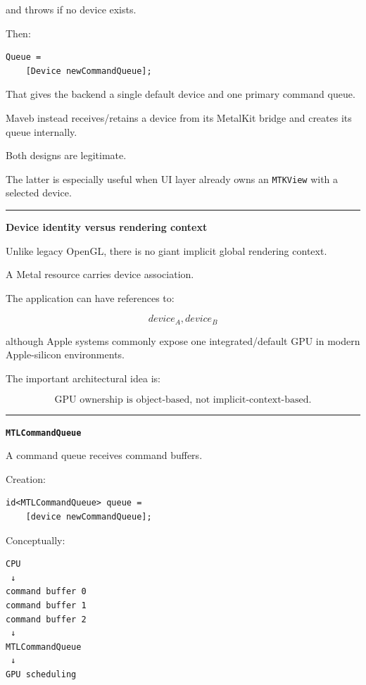 and throws if no device exists.

Then:

\begin{verbatim}
Queue =
    [Device newCommandQueue];
\end{verbatim}

That gives the backend a single default device and one primary command queue.

Maveb instead receives/retains a device from its MetalKit bridge and creates its queue internally.

Both designs are legitimate.

The latter is especially useful when UI layer already owns an \texttt{MTKView} with a selected device.

\begin{center}\rule{0.5\linewidth}{0.5pt}\end{center}

\textbf{Device identity versus rendering context}

Unlike legacy OpenGL, there is no giant implicit global rendering context.

A Metal resource carries device association.

The application can have references to:

\[
device_A,
device_B
\]

although Apple systems commonly expose one integrated/default GPU in modern Apple-silicon environments.

The important architectural idea is:

\[
\boxed{
\text{GPU ownership is object-based, not implicit-context-based}.
}
\]

\begin{center}\rule{0.5\linewidth}{0.5pt}\end{center}

\textbf{\texttt{MTLCommandQueue}}

A command queue receives command buffers.

Creation:

\begin{verbatim}
id<MTLCommandQueue> queue =
    [device newCommandQueue];
\end{verbatim}

Conceptually:

\begin{verbatim}
CPU
 ↓
command buffer 0
command buffer 1
command buffer 2
 ↓
MTLCommandQueue
 ↓
GPU scheduling
\end{verbatim}

